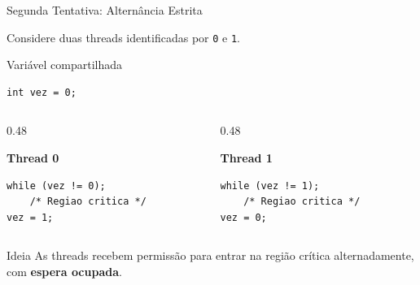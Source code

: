 \documentclass[aspectratio=169,11pt]{beamer}
\begin{document}
\begin{frame}[fragile]{Segunda Tentativa: Alternância Estrita}

Considere duas threads identificadas por
\texttt{0} e \texttt{1}.

\begin{block}{Variável compartilhada}

\begin{verbatim}
int vez = 0;
\end{verbatim}

\end{block}

\begin{columns}[T]

\begin{column}{0.48\textwidth}

\textbf{Thread 0}

\begin{verbatim}
while (vez != 0);
    /* Regiao critica */
vez = 1;
\end{verbatim}

\end{column}

\begin{column}{0.48\textwidth}

\textbf{Thread 1}

\begin{verbatim}
while (vez != 1);
    /* Regiao critica */
vez = 0;
\end{verbatim}

\end{column}

\end{columns}

\vspace{0.4cm}

\begin{block}{Ideia}
As threads recebem permissão para entrar
na região crítica alternadamente, com \textbf{espera ocupada}.
\end{block}

\end{frame}


\end{document}
